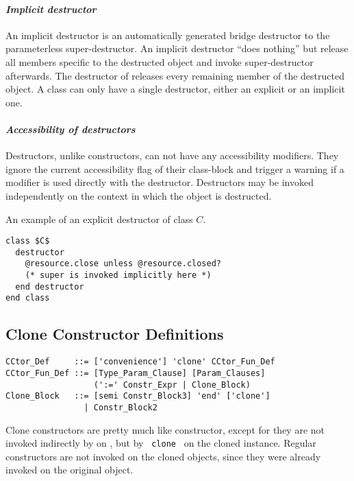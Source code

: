 \paragraph{\em Implicit destructor}
An implicit destructor is an automatically generated bridge destructor to the parameterless super-destructor. An implicit destructor ``does nothing'' but release all members specific to the destructed object and invoke super-destructor afterwards. The destructor of  releases every remaining member of the destructed object. A class can only have a single destructor, either an explicit or an implicit one. 

\paragraph{\em Accessibility of destructors}
Destructors, unlike constructors, can not have any accessibility modifiers. They ignore the current accessibility flag of their class-block and trigger a warning if a modifier is used directly with the destructor. Destructors may be invoked independently on the context in which the object is destructed. 

\example An example of an explicit destructor of class $C$. 
\begin{lstlisting}
class $C$
  destructor
    @resource.close unless @resource.closed?
    (* super is invoked implicitly here *)
  end destructor
end class
\end{lstlisting}






\subsection{Clone Constructor Definitions}
\label{sec:clone-def}

\syntax\begin{lstlisting}
CCtor_Def     ::= ['convenience'] 'clone' CCtor_Fun_Def
CCtor_Fun_Def ::= [Type_Param_Clause] [Param_Clauses] 
                  (':=' Constr_Expr | Clone_Block)
Clone_Block   ::= [semi Constr_Block3] 'end' ['clone']
                | Constr_Block2
\end{lstlisting}

Clone constructors are pretty much like constructor, except for they are not invoked indirectly by  on , but by ~\lstinline[deletekeywords={clone}]!clone!~ on the cloned instance. Regular constructors are not invoked on the cloned objects, since they were already invoked on the original object. 

